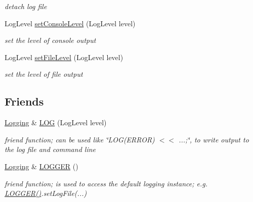 \begin{DoxyCompactItemize}
\begin{DoxyCompactList}\small\item\em detach log file \item\end{DoxyCompactList}\item 
\hypertarget{classnatrium_1_1Logging_a1bfdfbdfdf8a69e9aa9d6ffa78cb3d45}{
LogLevel \hyperlink{classnatrium_1_1Logging_a1bfdfbdfdf8a69e9aa9d6ffa78cb3d45}{setConsoleLevel} (LogLevel level)}
\label{classnatrium_1_1Logging_a1bfdfbdfdf8a69e9aa9d6ffa78cb3d45}

\begin{DoxyCompactList}\small\item\em set the level of console output \item\end{DoxyCompactList}\item 
\hypertarget{classnatrium_1_1Logging_a21852bc69b5ff32f5ec5241a810ab8d5}{
LogLevel \hyperlink{classnatrium_1_1Logging_a21852bc69b5ff32f5ec5241a810ab8d5}{setFileLevel} (LogLevel level)}
\label{classnatrium_1_1Logging_a21852bc69b5ff32f5ec5241a810ab8d5}

\begin{DoxyCompactList}\small\item\em set the level of file output \item\end{DoxyCompactList}\end{DoxyCompactItemize}
\subsection*{Friends}
\begin{DoxyCompactItemize}
\item 
\hyperlink{classnatrium_1_1Logging}{Logging} \& \hyperlink{classnatrium_1_1Logging_a913b816565b3ede4c25b89d25ca5148d}{LOG} (LogLevel level)
\begin{DoxyCompactList}\small\item\em friend function; can be used like \char`\"{}LOG(ERROR) $<$$<$ ...;\char`\"{}, to write output to the log file and command line \item\end{DoxyCompactList}\item 
\hypertarget{classnatrium_1_1Logging_a9339ce5458ee8cadf69734faf310c21b}{
\hyperlink{classnatrium_1_1Logging}{Logging} \& \hyperlink{classnatrium_1_1Logging_a9339ce5458ee8cadf69734faf310c21b}{LOGGER} ()}
\label{classnatrium_1_1Logging_a9339ce5458ee8cadf69734faf310c21b}

\begin{DoxyCompactList}\small\item\em friend function; is used to access the default logging instance; e.g. \hyperlink{classnatrium_1_1Logging_a9339ce5458ee8cadf69734faf310c21b}{LOGGER()}.setLogFile(...) \item\end{DoxyCompactList}\end{DoxyCompactItemize}


